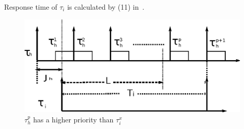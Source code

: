 \documentclass[conference]{IEEEtran}
\newtheorem{clm}{Claim}
\begin{document}

Response time of $\tau_{i}$ is calculated by (11) in~\cite{stmconcurrencycontrol:emsoft11}.
\begin{figure}
\begin{centering}
\includegraphics[scale=0.5]{figures/figure17-a}
\par\end{centering}
\caption{\label{fig17}$\tau_h^p$ has a higher priority than $\tau_i^x$}
\end{figure}
\end{document}
